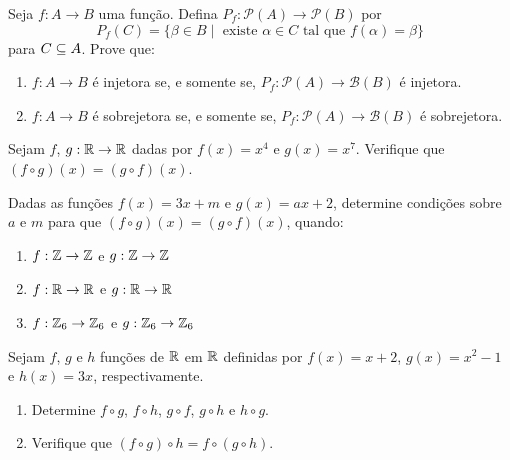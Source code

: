 \documentclass[12pt]{exam}
\begin{document}
    \vspace{.3cm}

    \questao{} Seja $f : A \to B$ uma função. Defina $P_f : \mathcal{P}(A) \to \mathcal{P}(B)$ por
    \[
        P_f(C) = \{\beta \in B \mid \mbox{ existe } \alpha \in C \mbox{ tal que } f(\alpha) = \beta\}
    \]
    para $C \subseteq A$. Prove que:
    \begin{enumerate}[label={\roman*})]

        \item $f : A \to B$ é injetora se, e somente se, $P_f : \mathcal{P}(A) \to \mathcal{B}(B)$ é injetora.

        \item $f : A \to B$ é sobrejetora se, e somente se, $P_f : \mathcal{P}(A) \to \mathcal{B}(B)$ é sobrejetora.
    \end{enumerate}


    \vspace{.3cm}

    \questao{} Sejam $f$, $g : \mathbb{R} \to \mathbb{R}$ dadas por $f(x) = x^4$ e $g(x) = x^7$. Verifique que $(f\circ g)(x) = (g\circ f)(x)$.

    \vspace{.3cm}

    \questao{} Dadas as fun\c{c}\~oes $f(x) = 3x + m$ e $g(x) = ax + 2$, determine condi\c{c}\~oes sobre $a$ e $m$ para que $(f\circ g)(x) = (g\circ f)(x)$, quando:
    \begin{enumerate}[label={\roman*})]
        \item $f : \mathbb{Z} \to \mathbb{Z}$ e $g : \mathbb{Z} \to \mathbb{Z}$
        \item $f : \mathbb{R} \to \mathbb{R}$ e $g : \mathbb{R} \to \mathbb{R}$
        \item $f : \mathbb{Z}_6 \to \mathbb{Z}_6$ e $g : \mathbb{Z}_6 \to \mathbb{Z}_6$
    \end{enumerate}

    \vspace{.3cm}

    \questao{} Sejam $f$, $g$ e $h$ fun\c{c}\~oes de $\mathbb{R}$ em $\mathbb{R}$ definidas por $f(x) = x + 2$, $g(x) = x^2 - 1$ e $h(x) = 3x$, respectivamente.
    \begin{enumerate}[label={\alph*})]
        \item Determine $f \circ g$, $f \circ h$, $g \circ f$, $g \circ h$ e $h \circ g$.
        \item Verifique que $(f \circ g)\circ h = f \circ (g \circ h)$.
    \end{enumerate}

    \vspace{.3cm}
\end{document}
